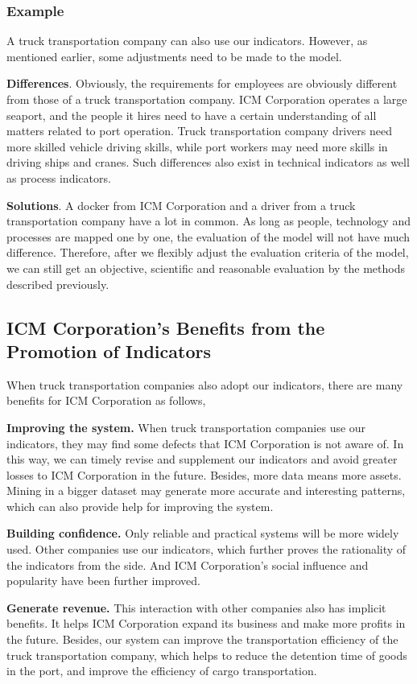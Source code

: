 \documentclass{mcmthesis}
\begin{document}
\subsubsection{Example}
A truck transportation company can also use our indicators. However, as mentioned earlier, some adjustments need to be made to the model.

\textbf{Differences}. Obviously, the requirements for employees are obviously different from those of a truck transportation company. ICM Corporation operates a large seaport, and the people it hires need to have a certain understanding of all matters related to port operation. Truck transportation company drivers need more skilled vehicle driving skills, while port workers may need more skills in driving ships and cranes. Such differences also exist in technical indicators as well as process indicators. 

\textbf{Solutions}. A docker from ICM Corporation and a driver from a truck transportation company have a lot in common. As long as people, technology and processes are mapped one by one, the evaluation of the model will not have much difference. Therefore, after we flexibly adjust the evaluation criteria of the model, we can still get an objective, scientific and reasonable evaluation by the methods described previously.

\subsection{ICM Corporation's Benefits from the Promotion of Indicators}
When truck transportation companies also adopt our indicators, there are many benefits for ICM Corporation as follows,

\textbf{Improving the system.} When truck transportation companies use our indicators, they may find some defects that ICM Corporation is not aware of. In this way, we can timely revise and supplement our indicators and avoid greater losses to ICM Corporation in the future. Besides, more data means more assets. Mining in a bigger dataset may generate more accurate and interesting patterns, which can also provide help for improving the system.

\textbf{Building confidence.} Only reliable and practical systems will be more widely used. Other companies use our indicators, which further proves the rationality of the indicators from the side. And ICM Corporation's social influence and popularity have been further improved.

\textbf{Generate revenue.} This interaction with other companies also has implicit benefits. It helps ICM Corporation expand its business and make more profits in the future. Besides, our system can improve the transportation efficiency of the truck transportation company, which helps to reduce the detention time of goods in the port, and improve the efficiency of cargo transportation.
\end{document}
